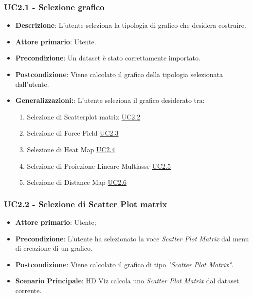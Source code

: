 \subsubsection{UC2.1 - Selezione grafico}
\label{ssub:uc2.1}
\begin{itemize}

	\item \textbf{Descrizione}: L’utente seleziona la tipologia di grafico che desidera costruire.

    \item \textbf{Attore primario}: Utente.

	\item \textbf{Precondizione}:   Un dataset è stato correttamente importato. 
	
    \item \textbf{Postcondizione}:  Viene calcolato il grafico della tipologia selezionata dall'utente.

	\item \textbf{Generalizzazioni:}:  L'utente seleziona il grafico desiderato tra:

		\begin{enumerate}
			
			\item Selezione di Scatterplot matrix \hyperref[ssub:uc2.2]{UC2.2}
			\item Selezione di Force Field \hyperref[ssub:uc2.3]{UC2.3}
			\item Selezione di Heat Map \hyperref[ssub:uc2.4]{UC2.4}
			\item Selezione di Proiezione Lineare Multiasse \hyperref[ssub:uc2.5]{UC2.5}
			\item Selezione di Distance Map \hyperref[ssub:uc2.6]{UC2.6}
			
		\end{enumerate}

\end{itemize}


\subsubsection{UC2.2 - Selezione di Scatter Plot matrix}
\label{ssub:uc2.2}
\begin{itemize}

    \item \textbf{Attore primario}: Utente;

    \item \textbf{Precondizione}:   L'utente ha selezionato la voce \emph{Scatter Plot Matrix} dal menu di creazione di un grafico.

    \item \textbf{Postcondizione}:  Viene calcolato il grafico di tipo \emph{"Scatter Plot Matrix"}.

	\item \textbf{Scenario Principale}: HD Viz calcola uno \emph{Scatter Plot Matrix} dal dataset corrente.
\end{itemize}


